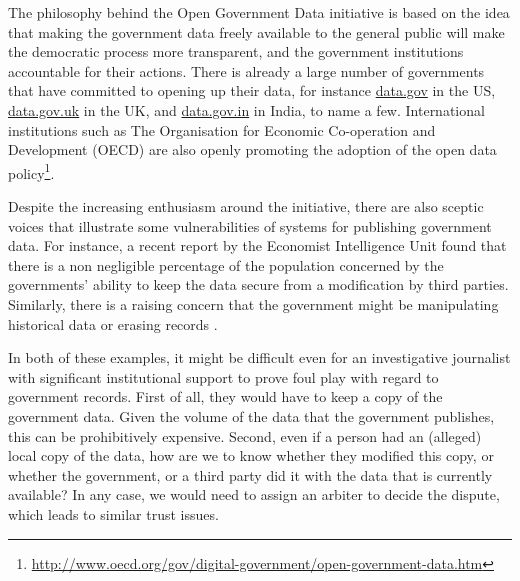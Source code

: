 The philosophy behind the Open Government Data initiative is based on the idea that making the government data freely available to the general public will make the democratic process more transparent, and the government institutions accountable for their actions. There is already a large number of governments that have committed to opening up their data, for instance \url{data.gov} in the US, \url{data.gov.uk} in the UK, and \url{data.gov.in} in India, to name a few. International institutions such as The Organisation for Economic Co-operation and Development (OECD) are also openly promoting the adoption of the open data policy\footnote{\url{http://www.oecd.org/gov/digital-government/open-government-data.htm}}.

Despite the increasing enthusiasm around the initiative, there are also sceptic voices that illustrate some vulnerabilities of systems for publishing government data. For instance, a recent report by the Economist Intelligence Unit \cite{economist} found that there is a non negligible percentage of the population concerned by the governments' ability to keep the data secure from a modification by third parties. Similarly, there is a raising concern that the government might be manipulating historical data or erasing records \cite{poynter}.

In both of these examples, it might be difficult even for an investigative journalist with significant institutional support to prove foul play with regard to government records. First of all, they would have to keep a copy of the government data. Given the volume of the data that the government publishes, this can be prohibitively expensive. Second, even if a person had an (alleged) local copy of the data, how are we to know whether they modified this copy, or whether the government, or a third party did it with the data that is currently available? In any case, we would need to assign an arbiter to decide the dispute, which leads to similar trust issues.




